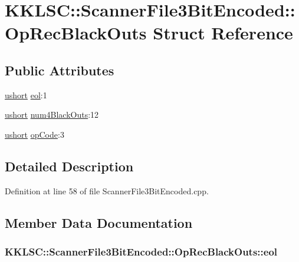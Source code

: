 \hypertarget{struct_scanner_file3_bit_encoded_1_1_op_rec_black_outs}{}\section{K\+K\+L\+SC\+:\+:Scanner\+File3\+Bit\+Encoded\+:\+:Op\+Rec\+Black\+Outs Struct Reference}
\label{struct_scanner_file3_bit_encoded_1_1_op_rec_black_outs}
\subsection*{Public Attributes}
\begin{DoxyCompactItemize}
\item 
\hyperlink{namespace_k_k_b_a4a7e2d1bab49f38edf25c38a8dc20012}{ushort} \hyperlink{struct_scanner_file3_bit_encoded_1_1_op_rec_black_outs_adf76be1749b44d26ff332790b7c6a2d4}{eol}\+:1
\item 
\hyperlink{namespace_k_k_b_a4a7e2d1bab49f38edf25c38a8dc20012}{ushort} \hyperlink{struct_scanner_file3_bit_encoded_1_1_op_rec_black_outs_af8ee06cfb18cead735b49c186c851769}{num4\+Black\+Outs}\+:12
\item 
\hyperlink{namespace_k_k_b_a4a7e2d1bab49f38edf25c38a8dc20012}{ushort} \hyperlink{struct_scanner_file3_bit_encoded_1_1_op_rec_black_outs_a462f9e9087a063f337aea3916b9f735b}{op\+Code}\+:3
\end{DoxyCompactItemize}


\subsection{Detailed Description}


Definition at line 58 of file Scanner\+File3\+Bit\+Encoded.\+cpp.



\subsection{Member Data Documentation}
\subsubsection[{\texorpdfstring{eol}{eol}}]{ K\+K\+L\+S\+C\+::\+Scanner\+File3\+Bit\+Encoded\+::\+Op\+Rec\+Black\+Outs\+::eol}\hypertarget{struct_scanner_file3_bit_encoded_1_1_op_rec_black_outs_adf76be1749b44d26ff332790b7c6a2d4}{}\label{struct_scanner_file3_bit_encoded_1_1_op_rec_black_outs_adf76be1749b44d26ff332790b7c6a2d4}



